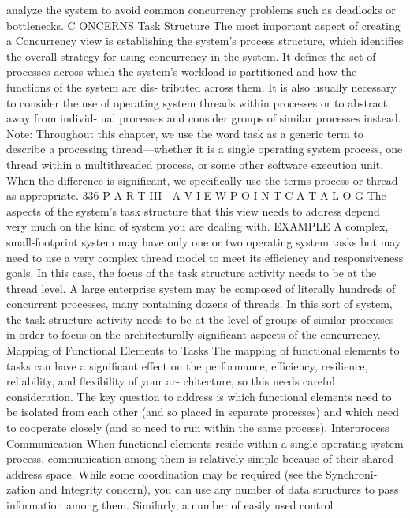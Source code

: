 analyze the system to avoid common concurrency problems such as deadlocks
or bottlenecks.
C ONCERNS
Task Structure
The most important aspect of creating a Concurrency view is establishing the
system’s process structure, which identifies the overall strategy for using
concurrency in the system. It defines the set of processes across which the
system’s workload is partitioned and how the functions of the system are dis-
tributed across them. It is also usually necessary to consider the use of
operating system threads within processes or to abstract away from individ-
ual processes and consider groups of similar processes instead.
Note: Throughout this chapter, we use the word task as a generic term to
describe a processing thread—whether it is a single operating system process,
one thread within a multithreaded process, or some other software execution
unit. When the difference is significant, we specifically use the terms process
or thread as appropriate.
336
P A R T III  A V I E W P O I N T C A T A L O G
The aspects of the system’s task structure that this view needs to address
depend very much on the kind of system you are dealing with.
EXAMPLE A complex, small-footprint system may have only one or two
operating system tasks but may need to use a very complex thread
model to meet its efficiency and responsiveness goals. In this case, the
focus of the task structure activity needs to be at the thread level.
A large enterprise system may be composed of literally hundreds of
concurrent processes, many containing dozens of threads. In this sort of
system, the task structure activity needs to be at the level of groups
of similar processes in order to focus on the architecturally significant
aspects of the concurrency.
Mapping of Functional Elements to Tasks
The mapping of functional elements to tasks can have a significant effect on
the performance, efficiency, resilience, reliability, and flexibility of your ar-
chitecture, so this needs careful consideration. The key question to address is
which functional elements need to be isolated from each other (and so placed
in separate processes) and which need to cooperate closely (and so need to
run within the same process).
Interprocess Communication
When functional elements reside within a single operating system process,
communication among them is relatively simple because of their shared
address space. While some coordination may be required (see the Synchroni-
zation and Integrity concern), you can use any number of data structures to
pass information among them. Similarly, a number of easily used control
